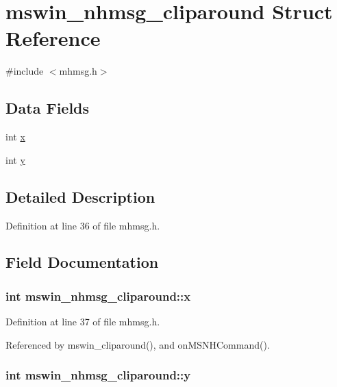 \hypertarget{structmswin__nhmsg__cliparound}{\section{mswin\+\_\+nhmsg\+\_\+cliparound Struct Reference}
\label{structmswin__nhmsg__cliparound}
}


{\ttfamily \#include $<$mhmsg.\+h$>$}

\subsection*{Data Fields}
\begin{DoxyCompactItemize}
\item 
int \hyperlink{structmswin__nhmsg__cliparound_aa4c933c98c2996de91a2ef67f3a2da60}{x}
\item 
int \hyperlink{structmswin__nhmsg__cliparound_abc364e920cd9ba1c7e851f369c5ea310}{y}
\end{DoxyCompactItemize}


\subsection{Detailed Description}


Definition at line 36 of file mhmsg.\+h.



\subsection{Field Documentation}
\hypertarget{structmswin__nhmsg__cliparound_aa4c933c98c2996de91a2ef67f3a2da60}{
\subsubsection[{x}]{\setlength{\rightskip}{0pt plus 5cm}int mswin\+\_\+nhmsg\+\_\+cliparound\+::x}}\label{structmswin__nhmsg__cliparound_aa4c933c98c2996de91a2ef67f3a2da60}


Definition at line 37 of file mhmsg.\+h.



Referenced by mswin\+\_\+cliparound(), and on\+M\+S\+N\+H\+Command().

\hypertarget{structmswin__nhmsg__cliparound_abc364e920cd9ba1c7e851f369c5ea310}{
\subsubsection[{y}]{\setlength{\rightskip}{0pt plus 5cm}int mswin\+\_\+nhmsg\+\_\+cliparound\+::y}}\label{structmswin__nhmsg__cliparound_abc364e920cd9ba1c7e851f369c5ea310}



